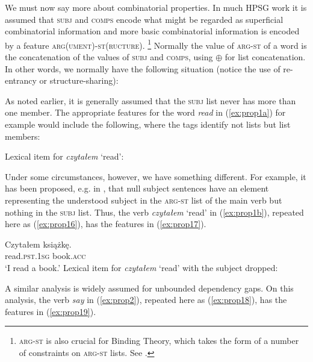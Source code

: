 \documentclass[output=paper
	        ,collection
	        ,collectionchapter
 	        ,biblatex
                ,babelshorthands
                ,newtxmath
                ,draftmode
                ,colorlinks, citecolor=brown
]{langscibook}
\begin{document}
We must now say more about combinatorial properties. In much HPSG work it is assumed that \textsc{subj} and \textsc{comps} encode what might be regarded as superficial combinatorial information and more basic combinatorial information is encoded by a feature \textsc{arg(ument)-st(ructure)}.%
%
\footnote{\textsc{arg-st} is also crucial for Binding Theory, which takes the form of a number of constraints on \textsc{arg-st} lists. See .}
%
Normally the value of \textsc{arg-st} of a word is the concatenation of the values of \textsc{subj} and \textsc{comps}, using $\oplus$ for list concatenation. In other words, we normally have the following situation (notice the use of re-entrancy or structure-sharing):

\ea\label{ex:prop14}
\z

\noindent
As noted earlier, it is generally assumed that the \textsc{subj} list never has more than one member. The appropriate features for the word \emph{read} in (\ref{ex:prop1a}) for example would include the following, where the tags identify not lists but list members:

\eas
\label{ex:prop15}
Lexical item for \emph{czytałem} `read':\\
\zs

\noindent
Under some circumstances, however, we have something different. For example, it has been proposed, e.g. in \citet[65]{MS99a}, that null subject sentences have an element representing the understood subject in the \textsc{arg-st} list of the main verb but nothing in the \textsc{subj} list. Thus, the verb \emph{czytałem} `read' in (\ref{ex:prop1b}), repeated here as (\ref{ex:prop16}), has the features in (\ref{ex:prop17}).

\ea\label{ex:prop16}
\gll Czytałem książkę.\\
read.\textsc{pst.1sg} book.\textsc{acc}\\
\glt `I read a book.'
\z
\ea\label{ex:prop17}
Lexical item for \emph{czytałem} `read' with the subject dropped:\\
\z

\noindent
A similar analysis is widely assumed for unbounded dependency gaps. On this analysis, the verb \emph{say} in (\ref{ex:prop2}), repeated here as (\ref{ex:prop18}), has the features in (\ref{ex:prop19}).
\end{document}
